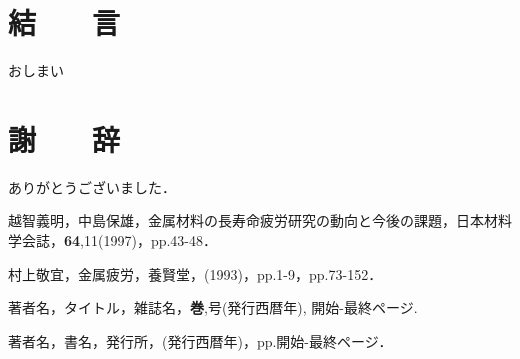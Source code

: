 \documentclass{jsarticle}
\begin{document}
\section{結　　言}
おしまい

\section*{謝　　辞}
ありがとうございました．

\begin{thebibliography}{99}
越智義明，中島保雄，金属材料の長寿命疲労研究の動向と今後の課題，日本材料学会誌，{\bfseries 64},11(1997)，pp.43-48．

村上敬宜，金属疲労，養賢堂，(1993)，pp.1-9，pp.73-152．

著者名，タイトル，雑誌名，{\bfseries 巻},号(発行西暦年), 開始-最終ページ.

著者名，書名，発行所，(発行西暦年)，pp.開始-最終ページ．
\end{thebibliography}
\end{document}
